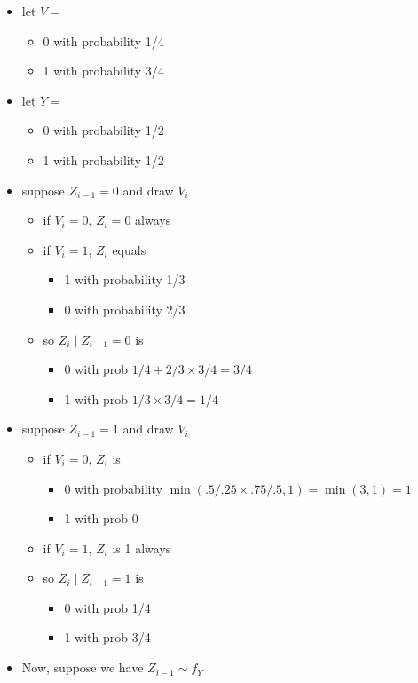 \documentclass[11pt]{article}
\begin{document}
\begin{itemize}
\item let $V =$
\begin{itemize}
\item 0 with probability 1/4
\item 1 with probability 3/4
\end{itemize}
\item let $Y =$
\begin{itemize}
\item 0 with probability 1/2
\item 1 with probability 1/2
\end{itemize}
\item suppose $Z_{i-1} = 0$ and draw $V_i$
\begin{itemize}
\item if $V_i = 0$, $Z_i = 0$ always
\item if $V_i = 1$, $Z_i$ equals
\begin{itemize}
\item 1 with probability 1/3
\item 0 with probability 2/3
\end{itemize}
\item so $Z_i \mid Z_{i-1} = 0$ is
\begin{itemize}
\item 0 with prob $1/4 + 2/3 \times 3/4 = 3/4$
\item 1 with prob $1/3 \times 3/4 = 1/4$
\end{itemize}
\end{itemize}
\item suppose $Z_{i-1} = 1$ and draw $V_i$
\begin{itemize}
\item if $V_i = 0$, $Z_i$ is
\begin{itemize}
\item 0 with probability $\min(.5/.25 \times .75/.5, 1) =
            \min(3,1) = 1$
\item 1 with prob 0
\end{itemize}
\item if $V_i = 1$, $Z_i$ is 1 always
\item so $Z_i \mid Z_{i-1} = 1$ is
\begin{itemize}
\item 0 with prob 1/4
\item 1 with prob 3/4
\end{itemize}
\end{itemize}
\item Now, suppose we have $Z_{i-1} \sim f_Y$

\end{itemize}
\end{document}
